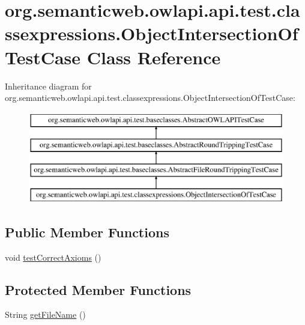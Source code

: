\hypertarget{classorg_1_1semanticweb_1_1owlapi_1_1api_1_1test_1_1classexpressions_1_1_object_intersection_of_test_case}{\section{org.\-semanticweb.\-owlapi.\-api.\-test.\-classexpressions.\-Object\-Intersection\-Of\-Test\-Case Class Reference}
\label{classorg_1_1semanticweb_1_1owlapi_1_1api_1_1test_1_1classexpressions_1_1_object_intersection_of_test_case}
}
Inheritance diagram for org.\-semanticweb.\-owlapi.\-api.\-test.\-classexpressions.\-Object\-Intersection\-Of\-Test\-Case\-:\begin{figure}[H]
\begin{center}
\leavevmode
\includegraphics[height=4.000000cm]{classorg_1_1semanticweb_1_1owlapi_1_1api_1_1test_1_1classexpressions_1_1_object_intersection_of_test_case}
\end{center}
\end{figure}
\subsection*{Public Member Functions}
\begin{DoxyCompactItemize}
\item 
void \hyperlink{classorg_1_1semanticweb_1_1owlapi_1_1api_1_1test_1_1classexpressions_1_1_object_intersection_of_test_case_af05baf259d2e783e0d88e829418a96f8}{test\-Correct\-Axioms} ()
\end{DoxyCompactItemize}
\subsection*{Protected Member Functions}
\begin{DoxyCompactItemize}
\item 
String \hyperlink{classorg_1_1semanticweb_1_1owlapi_1_1api_1_1test_1_1classexpressions_1_1_object_intersection_of_test_case_a6f34b8a079dab534affa30dd4424e104}{get\-File\-Name} ()
\end{DoxyCompactItemize}


